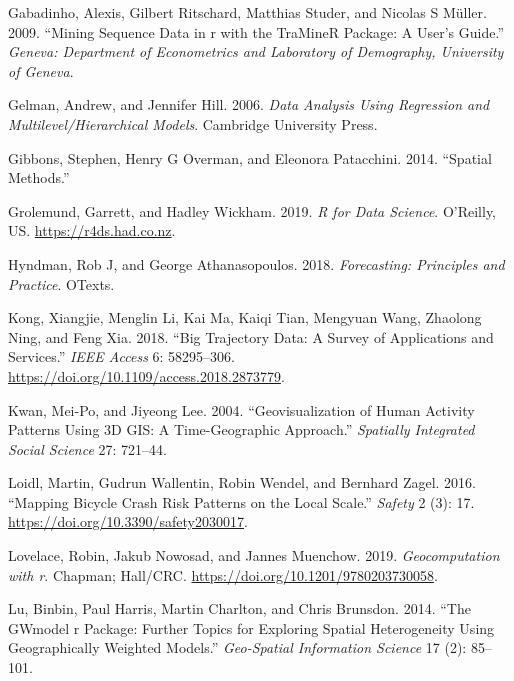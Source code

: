 \documentclass[
  letterpaper,
  krantz2]{style/krantz}
\newlength{\cslhangindent}
\newlength{\cslentryspacingunit} %
\newenvironment{CSLReferences}[2] %
 {%
  \setlength{\parindent}{0pt}
  \ifodd #1
  \let\oldpar\par
  \def\par{\hangindent=\cslhangindent\oldpar}
  \fi
  \setlength{\parskip}{#2\cslentryspacingunit}
 }%
 {}
\begin{document}
\begin{CSLReferences}{1}{0}
\leavevmode{}%
Gabadinho, Alexis, Gilbert Ritschard, Matthias Studer, and Nicolas S
Müller. 2009. {``Mining Sequence Data in r with the TraMineR Package: A
User's Guide.''} \emph{Geneva: Department of Econometrics and Laboratory
of Demography, University of Geneva}.

\leavevmode{}%
Gelman, Andrew, and Jennifer Hill. 2006. \emph{Data Analysis Using
Regression and Multilevel/Hierarchical Models}. Cambridge University
Press.

\leavevmode{}%
Gibbons, Stephen, Henry G Overman, and Eleonora Patacchini. 2014.
{``Spatial Methods.''}

\leavevmode{}%
Grolemund, Garrett, and Hadley Wickham. 2019. \emph{R for Data Science}.
O'Reilly, US. \url{https://r4ds.had.co.nz}.

\leavevmode{}%
Hyndman, Rob J, and George Athanasopoulos. 2018. \emph{Forecasting:
Principles and Practice}. OTexts.

\leavevmode{}%
Kong, Xiangjie, Menglin Li, Kai Ma, Kaiqi Tian, Mengyuan Wang, Zhaolong
Ning, and Feng Xia. 2018. {``Big Trajectory Data: A Survey of
Applications and Services.''} \emph{IEEE Access} 6: 58295--306.
\url{https://doi.org/10.1109/access.2018.2873779}.

\leavevmode{}%
Kwan, Mei-Po, and Jiyeong Lee. 2004. {``Geovisualization of Human
Activity Patterns Using 3D GIS: A Time-Geographic Approach.''}
\emph{Spatially Integrated Social Science} 27: 721--44.

\leavevmode{}%
Loidl, Martin, Gudrun Wallentin, Robin Wendel, and Bernhard Zagel. 2016.
{``Mapping Bicycle Crash Risk Patterns on the Local Scale.''}
\emph{Safety} 2 (3): 17. \url{https://doi.org/10.3390/safety2030017}.

\leavevmode{}%
Lovelace, Robin, Jakub Nowosad, and Jannes Muenchow. 2019.
\emph{Geocomputation with r}. Chapman; Hall/CRC.
\url{https://doi.org/10.1201/9780203730058}.

\leavevmode{}%
Lu, Binbin, Paul Harris, Martin Charlton, and Chris Brunsdon. 2014.
{``The GWmodel r Package: Further Topics for Exploring Spatial
Heterogeneity Using Geographically Weighted Models.''} \emph{Geo-Spatial
Information Science} 17 (2): 85--101.


\end{CSLReferences}
\end{document}
